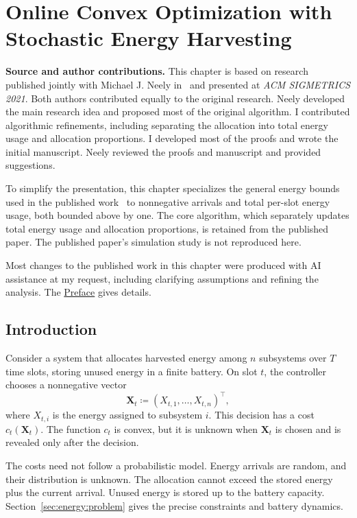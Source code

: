 \chapter{Online Convex Optimization with Stochastic Energy Harvesting}
\label{Section:ChapEnergyharvest}

\noindent\textbf{Source and author contributions.}
This chapter is based on research published jointly with Michael J. Neely
in~\cite{10.1145/3428337} and presented at \emph{ACM SIGMETRICS 2021}.
Both authors contributed equally to the original research.
Neely developed the main research idea and proposed most of the original
algorithm. I contributed algorithmic refinements, including separating
the allocation into total energy usage and allocation proportions.
I developed most of the proofs and wrote the initial manuscript.
Neely reviewed the proofs and manuscript and provided suggestions.

To simplify the presentation, this chapter specializes the general energy
bounds used in the published work~\cite{10.1145/3428337} to
nonnegative arrivals and total per-slot energy usage, both bounded above
by one.
The core algorithm, which separately updates total energy usage and
allocation proportions, is retained from the published paper.
The published paper's simulation study is not reproduced here.

Most changes to the published work in this chapter were produced with AI
assistance at my request, including clarifying assumptions
and refining the analysis. The \hyperref[sec:ai-assistance]{Preface} gives details.

\section{Introduction}

Consider a system that allocates harvested energy among $n$ subsystems over
$T$ time slots, storing unused energy in a finite battery. On slot $t$, the
controller chooses a nonnegative vector
\[
    \mathbf{X}_t\coloneqq\left(X_{t,1},\ldots,X_{t,n}\right)^\top,
\]
where $X_{t,i}$ is the energy assigned to subsystem $i$. This decision has
a cost $c_t(\mathbf{X}_t)$. The function $c_t$ is convex, but it is unknown when $\mathbf{X}_t$ is
chosen and is revealed only after the decision.

The costs need not follow a probabilistic model. Energy arrivals are random,
and their distribution is unknown. The allocation cannot exceed the stored
energy plus the current arrival. Unused energy is stored up to the battery
capacity. Section~\ref{sec:energy:problem} gives the precise constraints
and battery dynamics.

